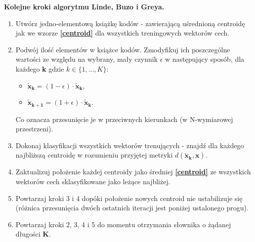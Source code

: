 \textbf{Kolejne kroki algorytmu Linde, Buzo i Greya.\cite{minidsp}}
\begin{enumerate}
  \item Utwórz jedno-elementową książkę kodów - zawierającą uśrednioną centroidę jak we wzorze \textbf{\ref{centroid}} dla wszystkich treningowych wektorów cech.
  \item Podwój ilość elementów w książce kodów. Zmodyfikuj ich poszczególne wartości ze względu na wybrany, mały czynnik $\epsilon$ w następujący sposób, dla każdego \textbf{k} gdzie \textbf{$ k \in \{1,...,K\}$}:
    \begin{itemize}
      \item $ \bm{\tilde{x}_k} = (1 - \epsilon) \cdot \bm{\tilde{x}_k} $,
      \item $ \bm{\tilde{x}_{k+1}} = (1 + \epsilon) \cdot \bm{\tilde{x}_k} $.
    \end{itemize}
    Co oznacza przesunięcie je w przeciwnych kierunkach (w N-wymiarowej przestrzeni).
  \item Dokonaj klasyfikacji wszystkich wektorów trenujących - znajdź dla każdego najbliższą centroidę w rozumieniu przyjętej metryki $ d(\bm{\tilde{x}_k}, \bm{x})$. 
  \item Zaktualizuj położenie każdej centroidy jako średniej \textbf{\ref{centroid}} ze wszystkich wektorów cech sklasyfikowane jako leżące najbliżej.
  \item Powtarzaj kroki 3 i 4 dopóki położenie nowych centroid nie ustabilizuje się (różnica przesunięcia dwóch ostatnich iteracji jest poniżej ustalonego progu).
  \item Powtarzaj kroki 2, 3, 4 i 5 do momentu otrzymania słownika o żądanej długości \textbf{K}.
\end{enumerate}


